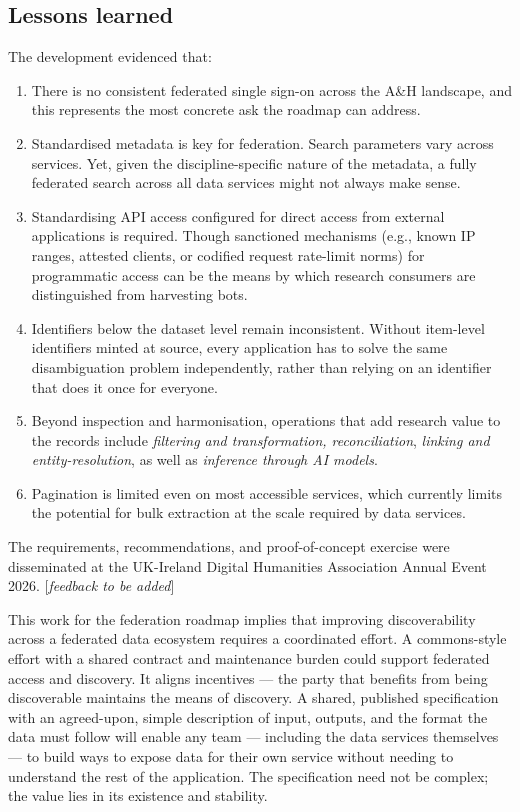 \documentclass[11pt]{scrartcl}
\begin{document}
\subsection{Lessons learned}
The development evidenced that:
\begin{enumerate}
\item There is no consistent federated single sign-on across the A\&H landscape, and this represents the most concrete ask the roadmap can address. 
\item Standardised metadata is key for federation. 
Search parameters vary across services. Yet, given the discipline-specific nature of the metadata, a fully federated search across all data services might not always make sense.
\item Standardising API access configured for direct access from external applications is required. Though sanctioned mechanisms (e.g., known IP ranges, attested clients, or codified request rate-limit norms) for programmatic access can be the means by which research consumers are distinguished from harvesting bots.
\item Identifiers below the dataset level remain inconsistent. Without item-level identifiers minted at source, every application has to solve the same disambiguation problem independently, rather than relying on an identifier that does it once for everyone.
\item Beyond inspection and harmonisation, operations that add research value to the records include \emph{filtering and transformation, reconciliation}, \emph{linking and entity-resolution}, as well as \emph{inference through AI models}.
\item Pagination is limited even on most accessible services, which currently limits the potential for bulk extraction at the scale required by data services. 
\end{enumerate}

The requirements, recommendations, and proof-of-concept exercise were disseminated at the UK-Ireland Digital Humanities Association Annual Event 2026. [\emph{feedback to be added}]

This work for the federation roadmap implies that improving discoverability across a federated data ecosystem requires a coordinated effort. A commons-style effort with a shared contract and maintenance burden could support federated access and discovery. It aligns incentives — the party that benefits from being discoverable maintains the means of discovery. A shared, published specification with an agreed-upon, simple description of input, outputs, and the format the data must follow will enable any team — including the data services themselves — to build ways to expose data for their own service without needing to understand the rest of the application. The specification need not be complex; the value lies in its existence and stability.
\end{document}
